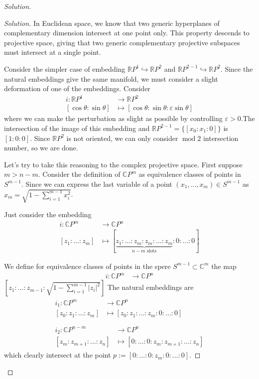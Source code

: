 \begin{proof}[Solution]
\begin{proof}[Solution]
	In Euclidean space, we know that two generic hyperplanes of complementary dimension intersect at one point only. This property descends to projective space, giving that two generic complementary projective subspaces must intersect at a single point. 

	Consider the simpler case of embedding \(\mathbb{R}P^1 \hookrightarrow \mathbb{R}P^2\) and \(\mathbb{R}P^{2-1}\hookrightarrow \mathbb{R}P^2\). Since the natural embeddings give the same manifold, we must consider a slight deformation of one of the embeddings. Consider
\begin{align*}
	i: \mathbb{R}P^1 &\longrightarrow \mathbb{R}P^2 \\
	[\cos \theta: \sin \theta] &\longmapsto [\cos \theta:\sin \theta:\varepsilon\sin \theta]
\end{align*}
where we can make the perturbation as slight as possible by controlling \(\varepsilon>0\).The intersection of the image of this embedding and \(\mathbb{R}P^{2-1}=\{[x_0:x_1:0]\}\) is \([1:0:0]\). Since \(\mathbb{R}P^2\) is not oriented, we can only consider \(\operatorname{mod}2\) intersection number, so we are done.

Let's try to take this reasoning to the complex projective space. First suppose \(m>n-m\). Consider the definition of \(\mathbb{C}P^{m}\) as equivalence classes of points in  \(S^{m-1}\). Since we can express the last variable of a point \((x_1,\ldots,x_m)\in S^{m-1}\) as \(x_m=\sqrt{1-\sum_{i=1}^{m-1} x_i^2}\).

Just consider the embedding
\begin{align*}
	i: \mathbb{C}P^m &\longrightarrow \mathbb{C}P^n \\
	[z_1:\ldots:z_m] &\longmapsto [\underbrace{z_1:\ldots:z_m:z_m:\ldots:z_m}_{n-m \text{ slots} }:0:\ldots:0]
\end{align*}


We define for equivalence classes of points in the spere \(S^{m-1}\subset \mathbb{C}^m\) the map
\begin{align*}
	i: \mathbb{C}P^m &\longrightarrow \mathbb{C}P^n \end{align*}
\(\left[z_1:\ldots:z_{m-1}:\sqrt{1-\sum_{i=1}^{m-1}|z_i|^2}\right] \)
The natural embeddings are
\begin{align*}
\begin{aligned}i_1: \mathbb{C}P^m &\longrightarrow \mathbb{C}P^n \\
	[z_0:z_1:\ldots:z_m] &\longmapsto [z_0:z_1:\ldots:z_m:0:\ldots:0]
\end{aligned}
\\\\\begin{aligned}	i_2: \mathbb{C}P^{n-m} &\longrightarrow \mathbb{C}P^n \\
[z_{m}:z_{m+1}:\ldots:z_n] &\longmapsto [0:\ldots:0:z_{m}:z_{m+1}:\ldots:z_n] \end{aligned}\end{align*}
which clearly intersect at the point \(p:=[0:\ldots:0:z_m:0:\ldots:0]\).


\end{proof}
\end{proof}

